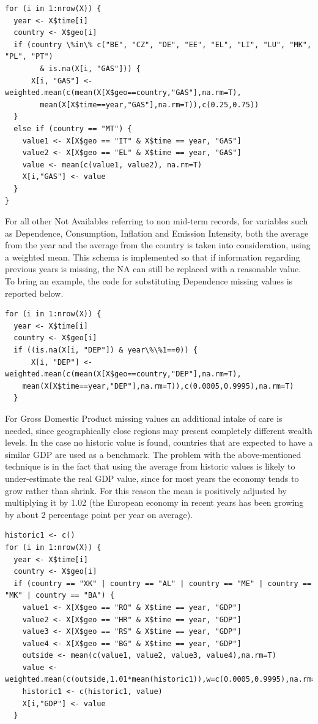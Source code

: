\documentclass{book}
\begin{document}
\begin{appendices}
\begin{verbatim}
for (i in 1:nrow(X)) {
  year <- X$time[i]
  country <- X$geo[i]
  if (country \%in\% c("BE", "CZ", "DE", "EE", "EL", "LI", "LU", "MK", "PL", "PT") 
		& is.na(X[i, "GAS"])) {
      X[i, "GAS"] <- weighted.mean(c(mean(X[X$geo==country,"GAS"],na.rm=T),
		mean(X[X$time==year,"GAS"],na.rm=T)),c(0.25,0.75))
  }
  else if (country == "MT") {
    value1 <- X[X$geo == "IT" & X$time == year, "GAS"]
    value2 <- X[X$geo == "EL" & X$time == year, "GAS"]
    value <- mean(c(value1, value2), na.rm=T)
    X[i,"GAS"] <- value
  }
}
\end{verbatim}

\noindent For all other Not Availables referring to non mid-term records, for variables such as Dependence, Consumption, Inflation and Emission Intensity, both the average from the year and the average from the country is taken into consideration, using a weighted mean. This schema is implemented so that if information regarding previous years is missing, the NA can still be replaced with a reasonable value. To bring an example, the code for substituting Dependence missing values is reported below.

\begin{verbatim}
for (i in 1:nrow(X)) {
  year <- X$time[i]
  country <- X$geo[i]
  if ((is.na(X[i, "DEP"]) & year\%\%1==0)) {
      X[i, "DEP"] <- weighted.mean(c(mean(X[X$geo==country,"DEP"],na.rm=T),
	mean(X[X$time==year,"DEP"],na.rm=T)),c(0.0005,0.9995),na.rm=T)
  }
\end{verbatim}

\noindent For Gross Domestic Product missing values an additional intake of care is needed, since geographically close regions may present completely different wealth levels. In the case no historic value is found, countries that are expected to have a similar GDP are used as a benchmark. The problem with the above-mentioned technique is in the fact that using the average from historic values is likely to under-estimate the real GDP value, since for most years the economy tends to grow rather than shrink. For this reason the mean is positively adjusted by multiplying it by 1.02 (the European economy in recent years has been growing by about 2 percentage point per year on average).

\begin{verbatim}
historic1 <- c()
for (i in 1:nrow(X)) {
  year <- X$time[i]
  country <- X$geo[i]
  if (country == "XK" | country == "AL" | country == "ME" | country == "MK" | country == "BA") {
    value1 <- X[X$geo == "RO" & X$time == year, "GDP"]
    value2 <- X[X$geo == "HR" & X$time == year, "GDP"]
    value3 <- X[X$geo == "RS" & X$time == year, "GDP"]
    value4 <- X[X$geo == "BG" & X$time == year, "GDP"]
    outside <- mean(c(value1, value2, value3, value4),na.rm=T)
    value <- weighted.mean(c(outside,1.01*mean(historic1)),w=c(0.0005,0.9995),na.rm=T)
    historic1 <- c(historic1, value)
    X[i,"GDP"] <- value
  }
\end{verbatim}


\end{appendices}
\end{document}
